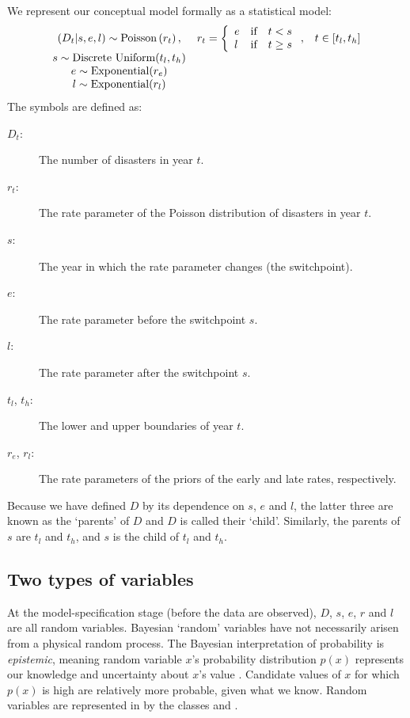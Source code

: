 \documentclass[]{jss}
\begin{document}
We represent our conceptual model formally as a statistical model:
\begin{equation}
    \begin{array}{ccc}
        (D_t | s, e, l) \sim \textup{Poisson}\left(r_t\right), & r_t=\left\{\begin{array}{lll}
            e &\textup{if}& t< s\\ l &\textup{if}& t\ge s
            \end{array}\right.,&t\in[t_l,t_h]\\
        s\sim \textup{Discrete Uniform}(t_l, t_h)\\
        e\sim \textup{Exponential}(r_e)\\
        l\sim \textup{Exponential}(r_l)
    \end{array}
    \label{disastermodel}
\end{equation}
The symbols are defined as:
\begin{description}
    \item[$D_t$:] The number of disasters in year $t$.
    \item[$r_t$:] The rate parameter of the Poisson distribution of disasters in year $t$.
    \item[$s$:] The year in which the rate parameter changes (the switchpoint).
    \item[$e$:] The rate parameter before the switchpoint $s$.
    \item[$l$:] The rate parameter after the switchpoint $s$.
    \item[$t_l$, $t_h$:] The lower and upper boundaries of year $t$.
    \item[$r_e$, $r_l$:] The rate parameters of the priors of the early and late rates, respectively.
\end{description}
Because we have defined $D$ by its dependence on $s$, $e$ and $l$, the latter three are known as the `parents' of $D$ and $D$ is called their `child'. Similarly, the parents of $s$ are $t_l$ and $t_h$, and $s$ is the child of $t_l$ and $t_h$.


\subsection{Two types of variables}

At the model-specification stage (before the data are observed), $D$, $s$, $e$,
$r$ and $l$ are all random variables. Bayesian `random' variables have not
necessarily arisen from a physical random process. The Bayesian interpretation
of probability is \emph{epistemic}, meaning random variable $x$'s probability
distribution $p(x)$ represents our knowledge and uncertainty about $x$'s value
\citep{jaynes}. Candidate values of $x$ for which $p(x)$ is high are
relatively more probable, given what we know. Random variables are represented
in  by the classes  and .
\end{document}
